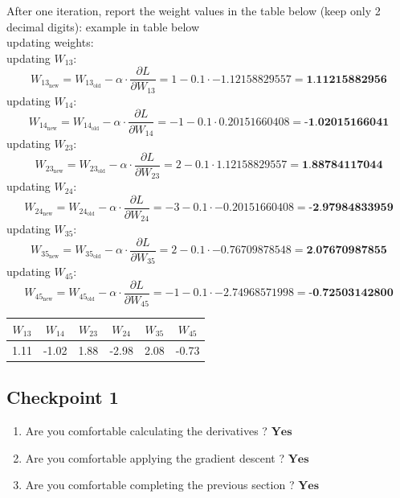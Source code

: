 \documentclass{article}
\begin{document}
\begin{enumerate}
    After one iteration, report the weight values in the table below (keep only 2 decimal digits): example
in table below
\\ updating weights:
\\ updating $W_{13}$:
    \[
    W_{13_{\text{new}}} = W_{13_{\text{old}}} - \alpha \cdot \frac{\partial L}{\partial W_{13}} = 1 - 0.1 \cdot -1.12158829557 = \textbf{1.11215882956}
    \]
updating $W_{14}$:
    \[
    W_{14_{\text{new}}} = W_{14_{\text{old}}} - \alpha \cdot \frac{\partial L}{\partial W_{14}} = -1 - 0.1 \cdot 0.20151660408 = \textbf{-1.02015166041}
    \]
updating $W_{23}$:
    \[
    W_{23_{\text{new}}} = W_{23_{\text{old}}} - \alpha \cdot \frac{\partial L}{\partial W_{23}} = 2 - 0.1 \cdot 1.12158829557 = \textbf{1.88784117044}
    \]
updating $W_{24}$:
    \[
    W_{24_{\text{new}}} = W_{24_{\text{old}}} - \alpha \cdot \frac{\partial L}{\partial W_{24}} = -3 - 0.1 \cdot -0.20151660408 = \textbf{-2.97984833959}
    \]
updating $W_{35}$:
    \[
    W_{35_{\text{new}}} = W_{35_{\text{old}}} - \alpha \cdot \frac{\partial L}{\partial W_{35}} = 2 - 0.1 \cdot -0.76709878548 = \textbf{2.07670987855}
    \]
updating $W_{45}$:
    \[
    W_{45_{\text{new}}} = W_{45_{\text{old}}} - \alpha \cdot \frac{\partial L}{\partial W_{45}} = -1 - 0.1 \cdot -2.74968571998 = \textbf{-0.72503142800}
    \]
    \begin{center}
        \begin{tabular}{|c|c|c|c|c|c|}
        \hline
        $W_{13}$ & $W_{14}$ & $W_{23}$ & $W_{24}$ & $W_{35}$ & $W_{45}$ \\ \hline
        1.11   & -1.02    & 1.88    & -2.98    & 2.08   &  -0.73  \\ \hline
        \end{tabular}
    \end{center}
\end{enumerate}

\subsection{Checkpoint 1}
\begin{enumerate}
    \item  Are you comfortable calculating the derivatives ? $\textbf{Yes}$
\item Are you comfortable applying the gradient descent ? $\textbf{Yes}$
\item Are you comfortable completing the previous section ? $\textbf{Yes}$
\end{enumerate}
\end{document}
